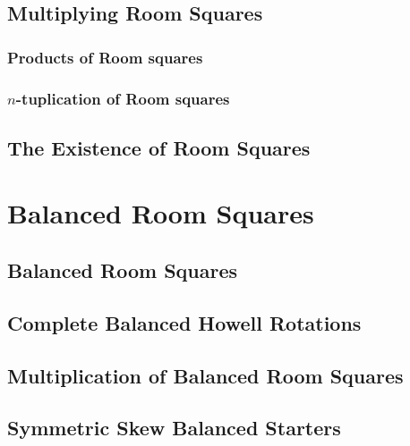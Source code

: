\documentclass[a4paper, draft]{book}
\begin{document}
\chapter{Multiplying Room Squares}
  \label{ch:multiplication-theorem}
  \section{Products of Room squares}
    \label{sec:multiplication-theorem}
    
  \section{$n$-tuplication of Room squares}
    \label{sec:n-tuplication}
    

\chapter{The Existence of Room Squares}
  \label{ch:existence-theorem}
  
  

\part{Balanced Room Squares}

\chapter{Balanced Room Squares}
  \label{ch:balanced-room-squares}
  

\chapter{Complete Balanced Howell Rotations}
  \label{ch:cbhr}
  
  

\chapter{Multiplication of Balanced Room Squares}
  \label{ch:brs-multiplication}
  

\chapter{Symmetric Skew Balanced Starters}
  \label{ch:symmetric-skew-balanced-starters}
  
\end{document}

